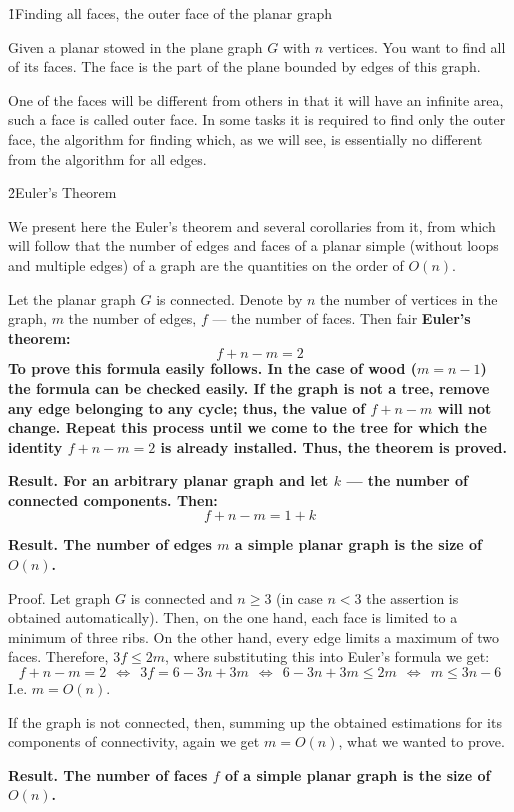\h1{Finding all faces, the outer face of the planar graph}

Given a planar stowed in the plane graph $G$ with $n$ vertices. You want to find all of its faces. The face is the part of the plane bounded by edges of this graph.

One of the faces will be different from others in that it will have an infinite area, such a face is called outer face. In some tasks it is required to find only the outer face, the algorithm for finding which, as we will see, is essentially no different from the algorithm for all edges.


\h2{Euler's Theorem}

We present here the Euler's theorem and several corollaries from it, from which will follow that the number of edges and faces of a planar simple (without loops and multiple edges) of a graph are the quantities on the order of $O(n)$.

Let the planar graph $G$ is connected. Denote by $n$ the number of vertices in the graph, $m$ the number of edges, $f$ --- the number of faces. Then fair \bf{Euler's theorem}:
$$ f + n - m = 2 $$
To prove this formula easily follows. In the case of wood ($m=n-1$) the formula can be checked easily. If the graph is not a tree, remove any edge belonging to any cycle; thus, the value of $f+n-m$ will not change. Repeat this process until we come to the tree for which the identity $f+n-m=2$ is already installed. Thus, the theorem is proved.

\bf{Result}. For an arbitrary planar graph and let $k$ --- the number of connected components. Then:
$$ f + n - m = 1 + k $$

\bf{Result}. The number of edges $m$ a simple planar graph is the size of $O(n)$.

Proof. Let graph $G$ is connected and $n \ge 3$ (in case $n < 3$ the assertion is obtained automatically). Then, on the one hand, each face is limited to a minimum of three ribs. On the other hand, every edge limits a maximum of two faces. Therefore, $3f \le 2m$, where substituting this into Euler's formula we get:
$$ f + n - m = 2\ \ \Leftrightarrow\ \ 3f = 6 - 3n + 3m\ \ \Leftrightarrow\ \ 6 - 3n + 3m \le 2m\ \ \Leftrightarrow\ \ m \le 3n - 6 $$
I.e. $m = O(n)$.

If the graph is not connected, then, summing up the obtained estimations for its components of connectivity, again we get $m = O(n)$, what we wanted to prove.

\bf{Result}. The number of faces $f$ of a simple planar graph is the size of $O(n)$.

